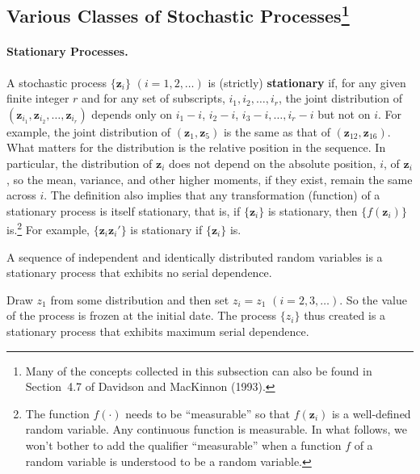 \subsection*{Various Classes of Stochastic Processes\protect\footnote{Many of the
concepts collected in this subsection can also be found in Section~4.7 of Davidson
and MacKinnon (1993).}}

\paragraph{Stationary Processes.}
A stochastic process $\{\mathbf{z}_i\}$ $(i = 1, 2, \ldots)$ is (strictly)
\textbf{stationary} if, for any given finite integer $r$ and for any set of subscripts,
$i_1, i_2, \ldots, i_r$, the joint distribution of
$(\mathbf{z}_{i_1}, \mathbf{z}_{i_2}, \ldots, \mathbf{z}_{i_r})$ depends only on
$i_1 - i$, $i_2 - i$, $i_3 - i, \ldots, i_r - i$ but not on $i$.  For example, the
joint distribution of $(\mathbf{z}_1, \mathbf{z}_5)$ is the same as that of
$(\mathbf{z}_{12}, \mathbf{z}_{16})$.  What matters for the distribution is the
relative position in the sequence.  In particular, the distribution of $\mathbf{z}_i$
does not depend on the absolute position, $i$, of $\mathbf{z}_i$, so the mean,
variance, and other higher moments, if they exist, remain the same across $i$.
The definition also implies that any transformation (function) of a stationary
process is itself stationary, that is, if $\{\mathbf{z}_i\}$ is stationary, then
$\{f(\mathbf{z}_i)\}$ is.\footnote{The function $f(\cdot)$ needs to be ``measurable''
so that $f(\mathbf{z}_i)$ is a well-defined random variable.  Any continuous function
is measurable.  In what follows, we won't bother to add the qualifier ``measurable''
when a function $f$ of a random variable is understood to be a random variable.}
For example, $\{\mathbf{z}_i \mathbf{z}_i'\}$ is stationary if $\{\mathbf{z}_i\}$ is.

\begin{example}[i.i.d.\ sequences]
\label{ex:2.1}
A sequence of independent and identically distributed random variables is a
stationary process that exhibits no serial dependence.
\end{example}

\begin{example}
\label{ex:2.2}
Draw $z_1$ from some distribution and then set $z_i = z_1$
$(i = 2, 3, \ldots)$.  So the value of the process is frozen at the initial date.
The process $\{z_i\}$ thus created is a stationary process that exhibits maximum
serial dependence.
\end{example}


